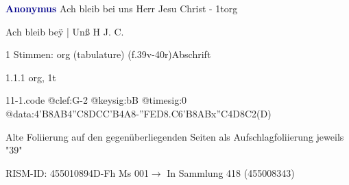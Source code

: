 \documentclass[twocolumn]{book}
\begin{document}
\par \vspace{7pt} \textcolor{darkblue}{\textbf{Anonymus  }}\hfillplus{\textbf{[11]}}\newline Ach bleib bei uns Herr Jesu Christ - 1t\newline org
\par \begin{itshape}[f.39v, at left:] Ach bleib beÿ | Unß H J. C.\end{itshape} 
\par \textcolor{darkblue}{}  1 Stimmen: org (tabulature)  (f.39v-40r)\newline Abschrift
\par 1.1.1  org, 1t  
\begin{filecontents*}{11-1.code}
@clef:G-2
@keysig:bB
@timesig:0
@data:4'B{8AB}4''C{8DC}{C'B}4A8-{''FED}{8.C6'B8AB}x''C4D8C2(D)
\end{filecontents*}
\newline
%
\par Alte Foliierung auf den gegenüberliegenden Seiten als Aufschlagfoliierung jeweils "39"
\par RISM-ID: 455010894\newline D-Fh  Ms 001\newline $\rightarrow$ In Sammlung 418 (455008343)
      
\end{document}
